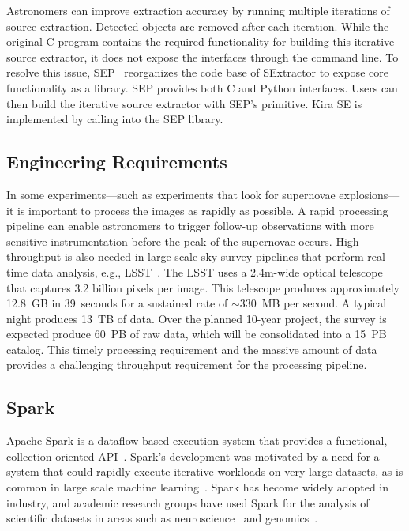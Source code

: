 \documentclass[10pt,journal,compsoc]{IEEEtran}
\begin{document}
Astronomers can improve extraction accuracy by running multiple iterations of source
extraction. Detected objects are removed after each iteration. While
the original C program contains the required functionality for building this iterative source extractor,
it does not expose the interfaces through the command line. To resolve this issue,
SEP~\cite{barbary2015} reorganizes the code base of SExtractor to expose core
functionality as a library. SEP provides both C and Python interfaces. Users can then
build the iterative source extractor with SEP's primitive. Kira SE is implemented by calling into
the SEP library.

\subsection{Engineering Requirements}
\label{sec:Background-EngReq}

In some experiments---such as experiments that look for supernovae explosions---it is important to process
the images as rapidly as possible. A rapid processing pipeline can enable astronomers to trigger follow-up
observations with more sensitive instrumentation before the peak of the supernovae occurs.
High throughput is also needed in large scale
sky survey pipelines that perform real time data analysis, e.g., LSST~\cite{ivezic08}.
The LSST uses a 2.4m-wide optical telescope that captures 3.2 billion pixels per
image. This telescope produces approximately 12.8~GB in 39~seconds
for a sustained rate of $\sim$330~MB per second. A typical night produces 13~TB of data. 
Over the planned 10-year project, the survey is expected produce 60~PB of raw data, which will be consolidated into a 15~PB catalog.
This timely processing requirement and the massive amount of data provides a challenging throughput requirement for the 
processing pipeline. 

\subsection{Spark}
Apache Spark is a dataflow-based execution system that provides a functional, collection
oriented API~\cite{zaharia12}. Spark's development was motivated by a need for a
system that could rapidly execute iterative workloads on very large datasets, as is common
in large scale machine learning~\cite{zaharia10}. Spark has
become widely adopted in industry, and academic research groups have used Spark
for the analysis of scientific datasets in areas such as neuroscience~\cite{freeman14} and genomics~\cite{nothaft15}.
\end{document}
